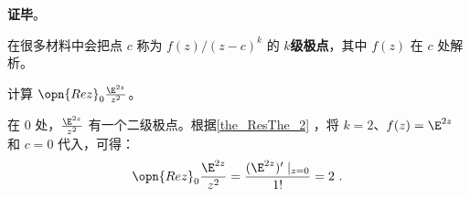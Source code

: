 \textbf{证毕}。


在很多材料中会把点 $c$ 称为 $f(z)/(z-c)^k$ 的 $k$\textbf{级极点}，其中 $f(z)$ 在 $c$ 处解析。

\begin{example}{}
计算 $\opn{Rez}_0 \frac{\E^{2z}}{z^2}$。

在 $0$ 处，$\frac{\E^{2z}}{z^2}$ 有一个二级极点。根据\autoref{the_ResThe_2} ，将 $k=2$、$f(z)=\E^{2z}$ 和 $c=0$ 代入，可得：
\begin{equation}
\opn{Rez}_0\frac{\E^{2z}}{z^2}=\frac{(\E^{2z})'\mid_{z=0}}{1!}=2~.
\end{equation}


\end{example}












